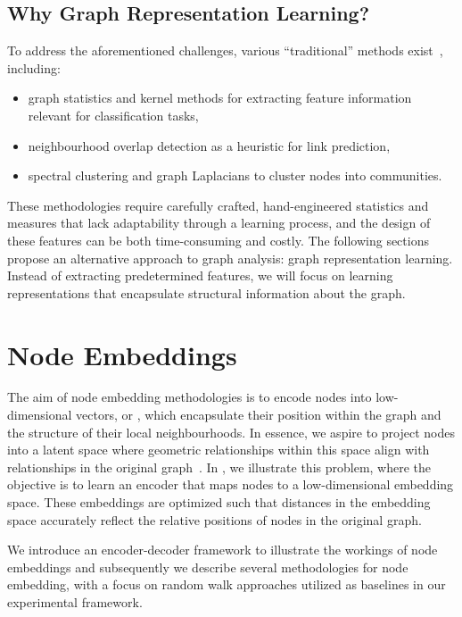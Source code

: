 \subsection{Why Graph Representation Learning?}
To address the aforementioned challenges, various ``traditional'' methods exist~\cite{Hamilton2020GraphRL}, including:
\begin{itemize}
    \item graph statistics and kernel methods for extracting feature information relevant for classification tasks,
    \item neighbourhood overlap detection as a heuristic for link prediction,
    \item spectral clustering and graph Laplacians to cluster nodes into communities.
\end{itemize}

These methodologies require carefully crafted, hand-engineered statistics and measures that lack adaptability through a learning process, and the design of these features can be both time-consuming and costly. The following sections propose an alternative approach to graph analysis: graph representation learning. Instead of extracting predetermined features, we will focus on learning representations that encapsulate structural information about the graph.

\section{Node Embeddings}\label{sec:shallowEmbeddings}
The aim of node embedding methodologies is to encode nodes into low-dimensional vectors, or , which encapsulate their position within the graph and the structure of their local neighbourhoods. In essence, we aspire to project nodes into a latent space where geometric relationships within this space align with relationships in the original graph~\cite{Hoff2002latentSpaceApproachesSocialNetworkAnalysis}. In , we illustrate this problem, where the objective is to learn an encoder that maps nodes to a low-dimensional embedding space. These embeddings are optimized such that distances in the embedding space accurately reflect the relative positions of nodes in the original graph.


We introduce an encoder-decoder framework to illustrate the workings of node embeddings and subsequently we describe several methodologies for node embedding, with a focus on random walk approaches utilized as baselines in our experimental framework.

